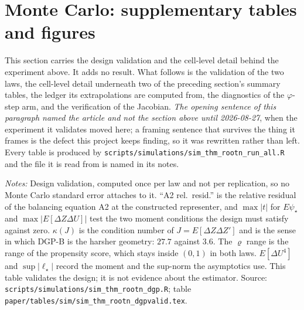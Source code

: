 \documentclass[
  12pt]{article}
\newcommand{\1}[1]{\mathds{1}\left[#1\right]}
\theoremstyle{plain}
\theoremstyle{definition}
\theoremstyle{definition}
\theoremstyle{remark}
\begin{document}
\clearpage

\section*{Monte Carlo: supplementary tables and figures}

This section carries the design validation and the cell-level detail behind the
experiment above. It adds no result. What follows is the validation of the two
laws, the cell-level detail underneath two of the preceding section's summary
tables, the ledger its extrapolations are computed from, the diagnostics of the
$\varphi$-step arm, and the verification of the Jacobian. \emph{The opening
sentence of this paragraph named the article and not the section above until
2026-08-27}, when the experiment it validates moved here; a framing sentence
that survives the thing it frames is the defect this project keeps finding, so
it was rewritten rather than left. Every table is
produced by \texttt{scripts/simulations/sim\_thm\_rootn\_run\_all.R} and the file
it is read from is named in its notes.

\begin{table}[!htbp]
\centering
\begin{threeparttable}
\caption{The two data-generating laws, and the conditions they were built to
satisfy}
\label{tab:supp-dgpvalid}
\footnotesize

\begin{tablenotes}\footnotesize
\item \textit{Notes:} Design validation, computed once per law and not per
replication, so no Monte Carlo standard error attaches to it. ``A2 rel.\ resid.''
is the relative residual of the balancing equation A2 at the constructed
representer, and $\max|t|$ for $E\psi_\star$ and
$\max|E[\Delta Z\Delta U]|$ test the two moment conditions the design must
satisfy against zero. $\kappa(J)$ is the condition number of
$J=E[\Delta Z\Delta Z']$ and is the sense in which DGP-B is the harsher geometry:
$27.7$ against $3.6$. The $\varrho$ range is the range of the propensity score,
which stays inside $(0,1)$ in both laws. $E[\Delta U^{4}]$ and
$\sup|\ell_\star|$ record the moment and the sup-norm the asymptotics use. This
table validates the design; it is not evidence about the estimator. Source:
\texttt{scripts/simulations/sim\_thm\_rootn\_dgp.R}; table
\texttt{paper/tables/sim/sim\_thm\_rootn\_dgpvalid.tex}.
\end{tablenotes}
\end{threeparttable}
\end{table}
\end{document}
